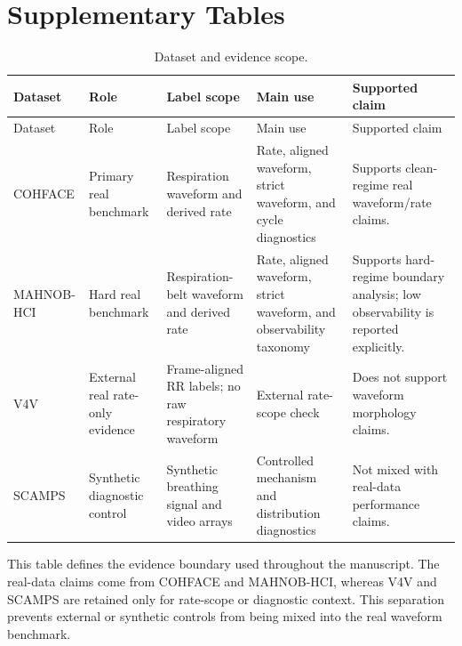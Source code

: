 \documentclass[10pt]{article}
\begin{document}
\section*{Supplementary Tables}

\begin{longtable}{L{1.9cm}L{2.35cm}L{2.65cm}L{3.65cm}L{3.20cm}}
\caption{Dataset and evidence scope.}\\
\toprule
Dataset & Role & Label scope & Main use & Supported claim \\
\midrule
\endfirsthead
\toprule
Dataset & Role & Label scope & Main use & Supported claim \\
\midrule
\endhead
COHFACE & Primary real benchmark & Respiration waveform and derived rate & Rate, aligned waveform, strict waveform, and cycle diagnostics & Supports clean-regime real waveform/rate claims. \\
MAHNOB-HCI & Hard real benchmark & Respiration-belt waveform and derived rate & Rate, aligned waveform, strict waveform, and observability taxonomy & Supports hard-regime boundary analysis; low observability is reported explicitly. \\
V4V & External real rate-only evidence & Frame-aligned RR labels; no raw respiratory waveform & External rate-scope check & Does not support waveform morphology claims. \\
SCAMPS & Synthetic diagnostic control & Synthetic breathing signal and video arrays & Controlled mechanism and distribution diagnostics & Not mixed with real-data performance claims. \\
\bottomrule
\end{longtable}

This table defines the evidence boundary used throughout the manuscript. The
real-data claims come from COHFACE and MAHNOB-HCI, whereas V4V and SCAMPS are
retained only for rate-scope or diagnostic context. This separation prevents
external or synthetic controls from being mixed into the real waveform
benchmark.
\end{document}
